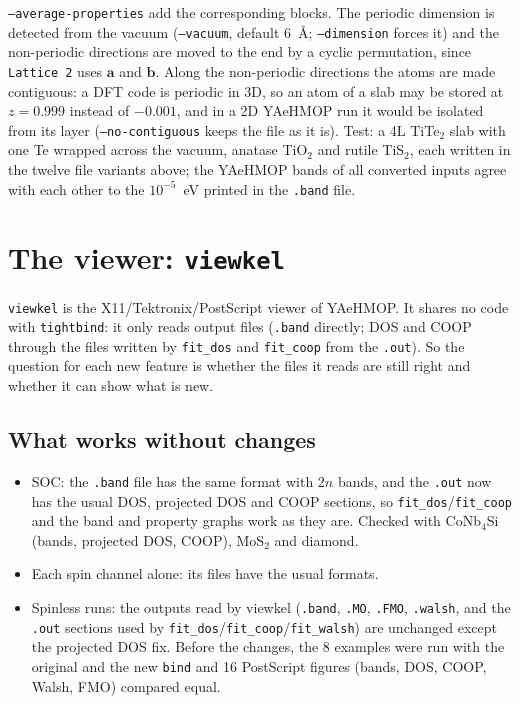 \documentclass[11pt,a4paper]{article}
\newcommand{\file}[1]{\texttt{#1}}
\newcommand{\opt}[1]{\texttt{#1}}
\begin{document}
\opt{--average-properties} add the corresponding blocks. The periodic dimension is detected from the
vacuum (\opt{--vacuum}, default 6~\AA; \opt{--dimension} forces it) and the non-periodic directions are
moved to the end by a cyclic permutation, since \texttt{Lattice 2} uses $\mathbf{a}$ and $\mathbf{b}$.
Along the non-periodic directions the atoms are made contiguous: a DFT code is periodic in 3D, so an atom
of a slab may be stored at $z=0.999$ instead of $-0.001$, and in a 2D YAeHMOP run it would be isolated
from its layer (\opt{--no-contiguous} keeps the file as it is). Test: a 4L TiTe$_2$ slab with one Te
wrapped across the vacuum, anatase TiO$_2$ and rutile TiS$_2$, each written in the twelve file variants
above; the YAeHMOP bands of all converted inputs agree with each other to the $10^{-5}$~eV printed in the
\texttt{.band} file.

\section{The viewer: \texttt{viewkel}}\label{sec:viewkel}

\texttt{viewkel} is the X11/Tektronix/PostScript viewer of YAeHMOP. It shares no code
with \texttt{tightbind}: it only reads output files (\texttt{.band} directly; DOS and COOP
through the files written by \file{fit\_dos} and \file{fit\_coop} from the \texttt{.out}).
So the question for each new feature is whether the files it reads are still right and
whether it can show what is new.

\subsection{What works without changes}
\begin{itemize}
\item SOC: the \texttt{.band} file has the same format with $2n$ bands, and the
  \texttt{.out} now has the usual DOS, projected DOS and COOP sections, so
  \file{fit\_dos}/\file{fit\_coop} and the band and property graphs work as they are.
  Checked with CoNb$_4$Si (bands, projected DOS, COOP), MoS$_2$ and diamond.
\item Each spin channel alone: its files have the usual formats.
\item Spinless runs: the outputs read by viewkel (\texttt{.band}, \texttt{.MO},
  \texttt{.FMO}, \texttt{.walsh}, and the \texttt{.out} sections used by
  \file{fit\_dos}/\file{fit\_coop}/\file{fit\_walsh}) are unchanged except the projected DOS
  fix. Before the changes, the 8 examples were run with the original and the new
  \texttt{bind} and 16 PostScript figures (bands, DOS, COOP, Walsh, FMO) compared equal.
\end{itemize}
\end{document}
